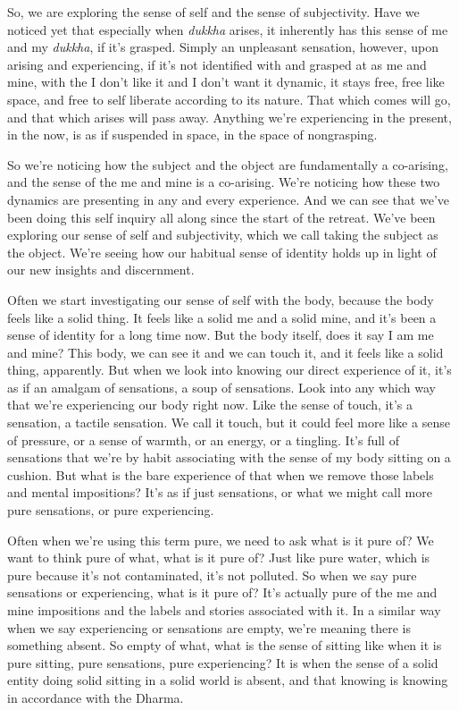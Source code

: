 \documentclass[12pt,openany]{book}
\begin{document}
So, we are exploring the sense of self and the sense of subjectivity. Have we noticed yet that especially when \textit{dukkha} arises, it inherently has this sense of me and my \textit{dukkha}, if it’s grasped. Simply an unpleasant sensation, however, upon arising and experiencing, if it's not identified with and grasped at as me and mine, with the I don’t like it and I don’t want it dynamic, it stays free, free like space, and free to self liberate according to its nature. That which comes will go, and that which arises will pass away. Anything we're experiencing in the present, in the now, is as if suspended in space, in the space of nongrasping. 

So we're noticing how the subject and the object are fundamentally a co-arising, and the sense of the me and mine is a co-arising. We're noticing how these two dynamics are presenting in any and every experience. And we can see that we've been doing this self inquiry all along since the start of the retreat. We've been exploring our sense of self and subjectivity, which we call taking the subject as the object. We're seeing how our habitual sense of identity holds up in light of our new insights and discernment.

Often we start investigating our sense of self with the body, because the body feels like a solid thing. It feels like a solid me and a solid mine, and it's been a sense of identity for a long time now. But the body itself, does it say I am me and mine? This body, we can see it and we can touch it, and it feels like a solid thing, apparently. But when we look into knowing our direct experience of it, it's as if an amalgam of sensations,  a soup of sensations. Look into any which way that we're experiencing our body right now. Like the sense of touch, it’s a sensation, a tactile sensation. We call it touch, but it could feel more like a sense of pressure, or a sense of warmth, or an energy, or a tingling. It's full of sensations that we’re by habit associating with the sense of my body sitting on a cushion. But what is the bare experience of that when we remove those labels and mental impositions? It’s as if just sensations, or what we might call more pure sensations, or pure experiencing. 

Often when we're using this term pure, we need to ask what is it pure of? We want to think pure of what, what is it pure of? Just like pure water, which is pure because it's not contaminated, it’s not polluted. So when we say pure sensations or experiencing, what is it pure of? It's actually pure of the me and mine impositions and the labels and stories associated with it. In a similar way when we say experiencing or sensations are empty, we're meaning there is something absent. So empty of what, what is the sense of sitting like when it is pure sitting, pure sensations, pure experiencing? It is when the sense of a solid entity doing solid sitting in a solid world is absent, and that knowing is knowing in accordance with the Dhar\-ma. 
\end{document}

